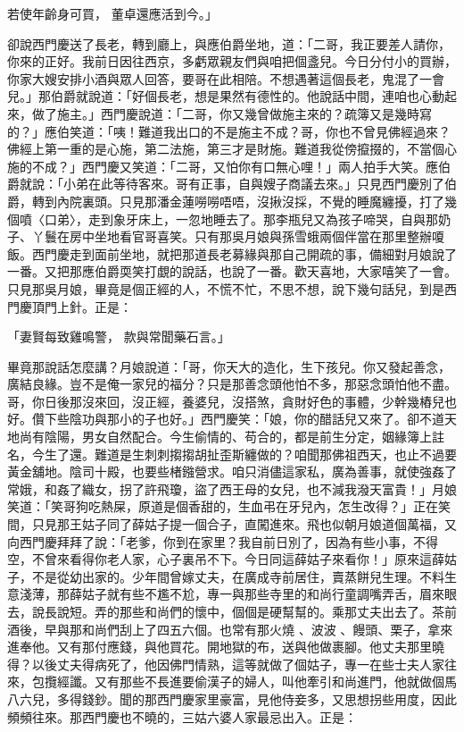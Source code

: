若使年齡身可買，  董卓還應活到今。」

卻說西門慶送了長老，轉到廳上，與應伯爵坐地，道：「二哥，我正要差人請你，你來的正好。我前日因往西京，多虧眾親友們與咱把個盞兒。今日分付小的買辦，你家大嫂安排小酒與眾人回答，要哥在此相陪。不想遇著這個長老，鬼混了一會兒。」那伯爵就說道：「好個長老，想是果然有德性的。他說話中間，連咱也心動起來，做了施主。」西門慶說道：「二哥，你又幾曾做施主來的？疏簿又是幾時寫的？」應伯笑道：「咦！難道我出口的不是施主不成？哥，你也不曾見佛經過來？佛經上第一重的是心施，第二法施，第三才是財施。難道我從傍攛掇的，不當個心施的不成？」西門慶又笑道：「二哥，又怕你有口無心哩！」兩人拍手大笑。應伯爵就說：「小弟在此等待客來。哥有正事，自與嫂子商議去來。」只見西門慶別了伯爵，轉到內院裏頭。只見那潘金蓮嘮嘮唔唔，沒揪沒採，不覺的睡魔纏擾，打了幾個噴〈口弟〉，走到象牙床上，一忽地睡去了。那李瓶兒又為孩子啼哭，自與那奶子、丫鬟在房中坐地看官哥喜笑。只有那吳月娘與孫雪蛾兩個伴當在那里整辦嗄飯。西門慶走到面前坐地，就把那道長老募緣與那自己開疏的事，備細對月娘說了一番。又把那應伯爵耎笑打覷的說話，也說了一番。歡天喜地，大家嘻笑了一會。只見那吳月娘，畢竟是個正經的人，不慌不忙，不思不想，說下幾句話兒，到是西門慶頂門上針。正是：

「妻賢每致雞鳴警，  款與常聞藥石言。」

畢竟那說話怎麼講？月娘說道：「哥，你天大的造化，生下孩兒。你又發起善念，廣結良緣。豈不是俺一家兒的福分？只是那善念頭他怕不多，那惡念頭怕他不盡。哥，你日後那沒來回，沒正經，養婆兒，沒搭煞，貪財好色的事體，少幹幾樁兒也好。儹下些陰功與那小的子也好。」西門慶笑：「娘，你的醋話兒又來了。卻不道天地尚有陰陽，男女自然配合。今生偷情的、苟合的，都是前生分定，姻緣簿上註名，今生了還。難道是生刺刺搊搊胡扯歪斯纏做的？咱聞那佛祖西天，也止不過要黃金舖地。陰司十殿，也要些楮鏹營求。咱只消儘這家私，廣為善事，就使強姦了常娥，和姦了織女，拐了許飛瓊，盜了西王母的女兒，也不減我潑天富貴！」月娘笑道：「笑哥狗吃熱屎，原道是個香甜的，生血弔在牙兒內，怎生改得？」正在笑間，只見那王姑子同了薛姑子提一個合子，直闖進來。飛也似朝月娘道個萬福，又向西門慶拜拜了說：「老爹，你到在家里？我自前日別了，因為有些小事，不得空，不曾來看得你老人家，心子裏吊不下。今日同這薛姑子來看你！」原來這薛姑子，不是從幼出家的。少年間曾嫁丈夫，在廣成寺前居住，賣蒸餅兒生理。不料生意淺薄，那薛姑子就有些不尷不尬，專一與那些寺里的和尚行童調嘴弄舌，眉來眼去，說長說短。弄的那些和尚們的懷中，個個是硬幫幫的。乘那丈夫出去了。茶前酒後，早與那和尚們刮上了四五六個。也常有那火燒 、波波 、饅頭、栗子，拿來進奉他。又有那付應錢，與他買花。開地獄的布，送與他做裹腳。他丈夫那里曉得？以後丈夫得病死了，他因佛門情熟，這等就做了個姑子，專一在些士夫人家往來，包攬經讖。又有那些不長進要偷漢子的婦人，叫他牽引和尚進門，他就做個馬八六兒，多得錢鈔。聞的那西門慶家里豪富，見他侍妾多，又思想拐些用度，因此頻頻往來。那西門慶也不曉的，三姑六婆人家最忌出入。正是：

